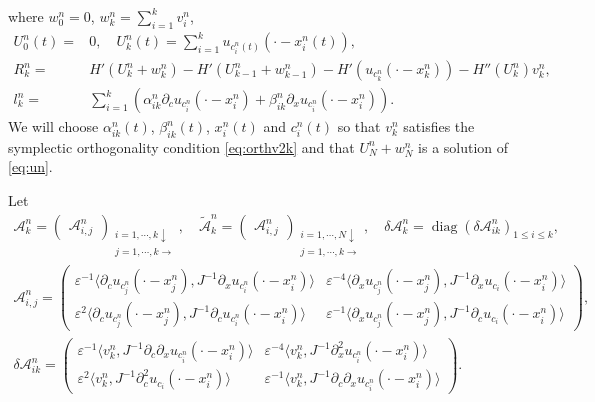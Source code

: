 \documentclass[11pt]{amsart}
\theoremstyle{remark}
\numberwithin{equation}{section}
\begin{document}
where $w_0^n=0$, $w_k^n=\sum_{i=1}^kv_i^n$,
\begin{align}
\label{eq:Ukdef}
U_0^n(t)=&0,\quad U_k^n(t)=\sum_{i=1}^k u_{c_i^n(t)}(\cdot-x_i^n(t)),\\
\label{eq:Rkdef}
R_k^n=&  H'(U_k^n+w_k^n)-H'(U_{k-1}^n+w_{k-1}^n)-H'(u_{c_k^n}(\cdot-x_k^n))
-H''(U_k^n)v_k^n,
\\
\label{eq:lkdef}
l_k^n=& \sum_{i=1}^k\left(\alpha_{ik}^n{\partial}_cu_{c_i^n}(\cdot-x_i^n)
+\beta_{ik}^n{\partial}_xu_{c_i^n}(\cdot-x_i^n)\right).
\end{align}
We will choose $\alpha_{ik}^n(t)$, $\beta_{ik}^n(t)$, $x_i^n(t)$ and $c_i^n(t)$
so that $v_k^n$ satisfies the symplectic orthogonality condition
\eqref{eq:orthv2k} and that $U_N^n+w_N^n$ is a solution of \eqref{eq:un}.
\par

Let
\begin{gather*}
\mathcal{A}_k^n=\begin{pmatrix}\mathcal{A}_{i,j}^n
\end{pmatrix}_{\substack{i=1,\cdots, k\downarrow\\ j=1,\cdots, k\rightarrow}},
\quad 
\widetilde{\mathcal{A}}_k^n=\begin{pmatrix}\mathcal{A}_{i,j}^n
\end{pmatrix}_{\substack{i=1,\cdots, N\downarrow\\ j=1,\cdots, k\rightarrow}},\quad
\delta\mathcal{A}_k^n=\operatorname{diag}(\delta\mathcal{A}_{ik}^n)_{1\le i\le k},
\\
\mathcal{A}_{i,j}^n=
 \begin{pmatrix}
{\varepsilon}^{-1}{\langle} {\partial}_cu_{c_j^n}(\cdot-x_j^n),
J^{-1}{\partial}_xu_{c_i^n}(\cdot-x_i^n){\rangle} 
& {\varepsilon}^{-4}{\langle} {\partial}_xu_{c_j^n}(\cdot-x_j^n),
J^{-1}{\partial}_xu_{c_i}(\cdot-x_i^n){\rangle}
 \\  {\varepsilon}^2{\langle} {\partial}_cu_{c_j^n}(\cdot-x_j^n),
J^{-1}{\partial}_cu_{c_i^n}(\cdot-x_i^n){\rangle}
 & {\varepsilon}^{-1}{\langle} {\partial}_xu_{c_j^n}(\cdot-x_j^n),
J^{-1}{\partial}_cu_{c_i}(\cdot-x_i^n){\rangle}
 \end{pmatrix},
\\
\delta\mathcal{A}_{ik}^n=
\begin{pmatrix} {\varepsilon}^{-1}{\langle} v_k^n ,
J^{-1}{\partial}_c{\partial}_xu_{c_i^n}(\cdot-x_i^n){\rangle}
& {\varepsilon}^{-4}{\langle} v_k^n, J^{-1}{\partial}_x^2u_{c_i^n}(\cdot-x_i^n){\rangle} \\ 
{\varepsilon}^2{\langle} v_k^n, J^{-1}{\partial}_c^2u_{c_i}(\cdot-x_i^n){\rangle}
& {\varepsilon}^{-1}{\langle} v_k^n, J^{-1}{\partial}_c{\partial}_xu_{c_i^n}(\cdot-x_i^n){\rangle}
\end{pmatrix}.
\end{gather*}
\end{document}
